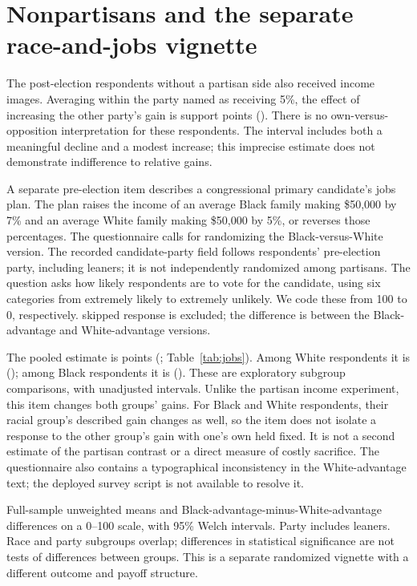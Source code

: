 \documentclass[11pt]{article}
\begin{document}
\clearpage
\section{Nonpartisans and the separate race-and-jobs vignette}
The \NonpartisanN{} post-election respondents without a partisan side also received income images. Averaging within the party named as receiving 5\%, the effect of increasing the other party's gain is \NonpartisanEstimate{} support points (\NonpartisanCI{}). There is no own-versus-opposition interpretation for these respondents. The interval includes both a meaningful decline and a modest increase; this imprecise estimate does not demonstrate indifference to relative gains.

A separate pre-election item describes a congressional primary candidate's jobs plan. The plan raises the income of an average Black family making \$50,000 by 7\% and an average White family making \$50,000 by 5\%, or reverses those percentages. The questionnaire calls for randomizing the Black-versus-White version. The recorded candidate-party field follows respondents' pre-election party, including leaners; it is not independently randomized among partisans. The question asks how likely respondents are to vote for the candidate, using six categories from extremely likely to extremely unlikely. We code these from 100 to 0, respectively. \JobsMissing{} skipped response is excluded; the difference is between the Black-advantage and White-advantage versions.

The pooled estimate is \JobsAllEstimate{} points (\JobsAllCI{}; Table~\ref{tab:jobs}). Among White respondents it is \JobsWhiteEstimate{} (\JobsWhiteCI{}); among Black respondents it is \JobsBlackEstimate{} (\JobsBlackCI{}). These are exploratory subgroup comparisons, with unadjusted intervals. Unlike the partisan income experiment, this item changes both groups' gains. For Black and White respondents, their racial group's described gain changes as well, so the item does not isolate a response to the other group's gain with one's own held fixed. It is not a second estimate of the partisan contrast or a direct measure of costly sacrifice. The questionnaire also contains a typographical inconsistency in the White-advantage text; the deployed survey script is not available to resolve it.

\begin{table}[!htbp]
\centering\small
\caption{Jobs vignette: stated likelihood of voting for the candidate.}
\label{tab:jobs}
\begin{minipage}{\linewidth}\footnotesize
Full-sample unweighted means and Black-advantage-minus-White-advantage differences on a 0--100 scale, with 95\% Welch intervals. Party includes leaners. Race and party subgroups overlap; differences in statistical significance are not tests of differences between groups. This is a separate randomized vignette with a different outcome and payoff structure.
\end{minipage}
\end{table}
\end{document}
